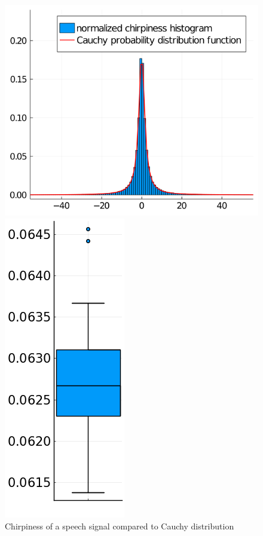\documentclass[
  american,
]{article}
\begin{document}
\begin{figure}[H]
    \begin{minipage}{.47\linewidth}
    \centering
    \includegraphics[width=\textwidth]{img/cauchy_dist_pdf.png}
    \caption{Chirpiness of a speech signal compared to Cauchy distribution}
    \label{fig:cauchy_dist}
    \end{minipage}%
    \hfill
    \begin{minipage}{.47\linewidth}
    \centering
        \includegraphics[width=.27\textwidth]{img/cauchy_pt_estimate_iqr_2.png}\hspace{0.1\linewidth}%

\end{minipage}
\end{figure}
\end{document}
